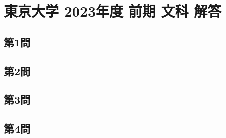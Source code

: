 ﻿\documentclass[../../uem_tok_a.tex]{subfiles}
\begin{document}
    \section{東京大学 2023年度 前期 文科 解答}

    \subsection{第1問}
    

    \clearpage
    \subsection{第2問}
    

    \clearpage
    \subsection{第3問}
    

    \clearpage
    \subsection{第4問}
    

    \clearpage
\end{document}
